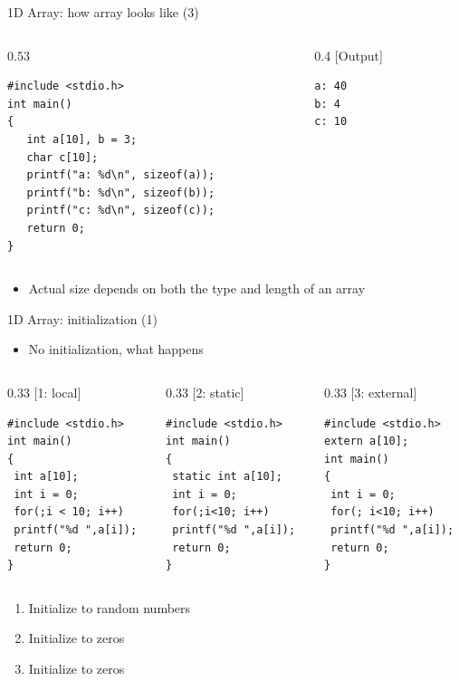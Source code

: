 \begin{frame}[fragile]{1D Array: how array looks like (3)}
\begin{columns}
\begin{column}{0.53\linewidth}
\begin{lstlisting}
#include <stdio.h>
int main()
{
   int a[10], b = 3;
   char c[10];
   printf("a: %d\n", sizeof(a));
   printf("b: %d\n", sizeof(b));
   printf("c: %d\n", sizeof(c));
   return 0;
}
\end{lstlisting}
\end{column}
\begin{column}{0.4\linewidth}
[Output]
\begin{lstlisting}
a: 40
b: 4
c: 10
\end{lstlisting}
\end{column}
\end{columns}
\vspace{0.1in}
\begin{itemize}
	\item {Actual size depends on both the type and length of an array}
\end{itemize}
\end{frame}

\begin{frame}[fragile]{1D Array: initialization (1)}
\begin{itemize}
	\item {No initialization, what happens}
\end{itemize}
\vspace{-0.1in}
\begin{columns}
\begin{column}{0.33\linewidth}
[1: local]
\begin{lstlisting}[numbers=none]
#include <stdio.h>
int main()
{
 int a[10];
 int i = 0;
 for(;i < 10; i++)
 printf("%d ",a[i]);
 return 0;
}
\end{lstlisting}
\end{column}
\begin{column}{0.33\linewidth}
[2: static]
\begin{lstlisting}[numbers=none]
#include <stdio.h>
int main()
{
 static int a[10];
 int i = 0;
 for(;i<10; i++)
 printf("%d ",a[i]);
 return 0;
}
\end{lstlisting}
\end{column}
\begin{column}{0.33\linewidth}
[3: external]
\begin{lstlisting}[numbers=none]
#include <stdio.h>
extern a[10];
int main()
{
 int i = 0;
 for(; i<10; i++)
 printf("%d ",a[i]);
 return 0;
}
\end{lstlisting}
\end{column}
\end{columns}
\begin{enumerate}
	\item {Initialize to random numbers}
	\item {Initialize to zeros}
	\item {Initialize to zeros}
\end{enumerate}

\end{frame}

